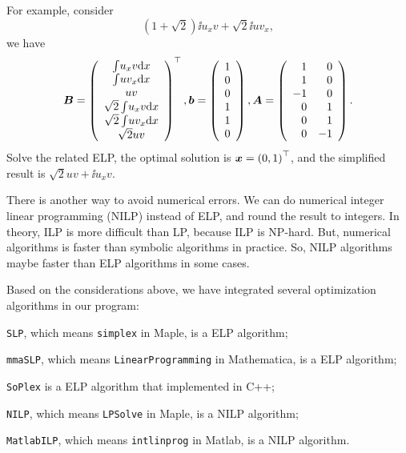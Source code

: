 For example, consider
\begin{equation}
\left(1+\sqrt{2}\right)\ii{u_x v}+\sqrt{2}\ii{u v_x}, 
\end{equation}
we have
\begin{equation}
\bm{B}=\left(
\begin{array}{c}
\int\!{u_x v\mathrm{d}x}  \\
\int\!{u v_x\mathrm{d}x}  \\
u v         \\
\sqrt{2}\int\!{u_x v\mathrm{d}x}  \\
\sqrt{2}\int\!{u v_x\mathrm{d}x}  \\
\sqrt{2}u v         \\
\end{array}
\right)^\top,
\bm{b}=\left(
\begin{array}{c}
1   \\
0   \\
0   \\
1   \\
1   \\
0   \\
\end{array}
\right),
\bm{A}=\left(
\begin{array}{rr}
1   & 0\\
1   & 0\\
-1  & 0\\
0   & 1\\
0   & 1\\
0   & -1\\
\end{array}
\right).
\end{equation}
Solve the related ELP, the optimal solution is $\bm{x}=\left(0,1\right)^\top$, and the simplified result is $\sqrt{2}uv+\ii{u_x v}$. 

There is another way to avoid numerical errors. We can do numerical integer linear programming (NILP) instead of ELP, and round the result to integers. In theory, ILP is more difficult than LP, because ILP is NP-hard. But, numerical algorithms is faster than symbolic algorithms in practice. So, NILP algorithms maybe faster than ELP algorithms in some cases.

Based on the considerations above, we have integrated several optimization algorithms in our program:
\begin{compactitem}[\textbullet]
\item \texttt{SLP}, which means \texttt{simplex} in Maple, is a ELP algorithm; 
\item \texttt{mmaSLP}, which means \texttt{LinearProgramming} in Mathematica, is a ELP algorithm;
\item \texttt{SoPlex} \citep{soplex} is a ELP algorithm that implemented in C++;
\item \texttt{NILP}, which means \texttt{LPSolve} in Maple, is a NILP algorithm;
\item \texttt{MatlabILP}, which means \texttt{intlinprog} in Matlab, is a NILP algorithm.
\end{compactitem}

